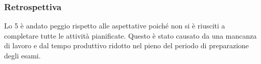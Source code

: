 \subsubsection{Retrospettiva}
\label{sec:sprint5_retrospettiva}
Lo  5 è andato peggio rispetto alle aspettative poiché non si è riusciti a completare tutte le attività pianificate. Questo è stato causato da una mancanza di lavoro e dal tempo produttivo ridotto nel pieno del periodo di preparazione degli esami. 